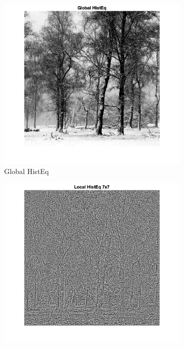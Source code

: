 \documentclass[12pt]{article}
\begin{document}
    \begin{figure}[h!]
        \centering
        
        \begin{subfigure}[b]{0.3\textwidth}
            \centering
            \includegraphics[width=\textwidth]{../images/LC2_globalHistEq.png}
            \caption{Global HistEq}
        \end{subfigure}
        \hfill
        \begin{subfigure}[b]{0.3\textwidth}
            \centering
            \includegraphics[width=\textwidth]{../images/LC2_localHistEq_7x7.png}

\end{subfigure}
\end{figure}
\end{document}
